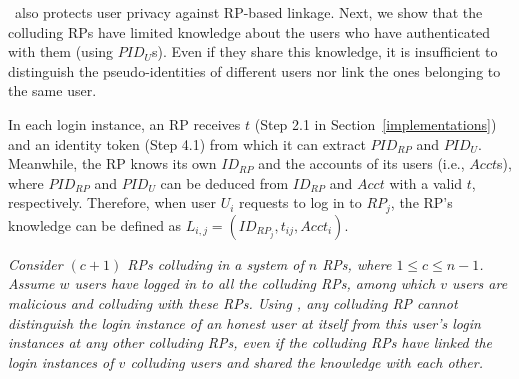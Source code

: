 {{%

\usso~also protects user privacy against RP-based linkage. Next, we show that the colluding RPs have limited knowledge about the users who have authenticated with them (using $PID_U$s). Even if they share this knowledge, it is insufficient to distinguish the pseudo-identities of different users nor link the ones belonging to the same user. 

In each login instance, an RP receives $t$ (Step 2.1 in Section~\ref{implementations}) and an identity token (Step 4.1) from which it can extract $PID_{RP}$ and $PID_U$. Meanwhile, the RP knows its own $ID_{RP}$ and the accounts of its users (i.e., $Acct$s), %
where $PID_{RP}$ and $PID_U$ can be deduced from $ID_{RP}$ and $Acct$ with a valid $t$, respectively. Therefore, when user $U_i$ requests to log in to $RP_j$, the RP's knowledge can be defined as $L_{i, j}=(ID_{RP_j}, t_{ij}, Acct_i)$. %

\vspace{1mm}
 {\em Consider $(c+1)$ RPs colluding in a system of $n$ RPs, where $1 \le c \le n-1$. Assume $w$ users have logged in to all the colluding RPs, among which $v$ users are malicious and colluding with these RPs. 
Using \usso, any colluding RP cannot distinguish the login instance of an honest user at itself from this user's login instances at any other colluding RPs, even if the colluding RPs have linked the login instances of $v$ colluding users and shared the knowledge with each other.}

}}
